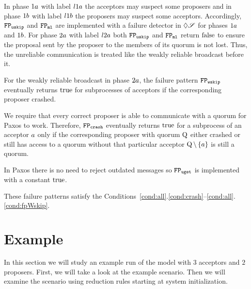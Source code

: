In phase $1a$ with label $l1a$ the acceptors may suspect some proposers and in phase $1b$ with label $l1b$ the proposers may suspect some acceptors.
Accordingly, $\mathtt{FP_{uskip}}$ and $\mathtt{FP_{ml}}$ are implemented with a failure detector in $\Diamond\mathscr{S}$ for phases $1a$ and $1b$.
For phase $2a$ with label $l2a$ both $\mathtt{FP_{uskip}}$ and $\mathtt{FP_{ml}}$ return $\operatorname{false}$ to ensure the proposal sent by the proposer to the members of its quorum is not lost.
Thus, the unreliable communication is treated like the weakly reliable broadcast before it.

For the weakly reliable broadcast in phase $2a$, the failure pattern $\mathtt{FP_{wskip}}$ eventually returns $\operatorname{true}$ for subprocesses of acceptors if the corresponding proposer crashed.

We require that every correct proposer is able to communicate with a quorum for Paxos to work.
Therefore, $\mathtt{FP_{crash}}$ eventually returns $\operatorname{true}$ for a subprocess of an acceptor $a$ only if the corresponding proposer with quorum $\operatorname{Q}$ either crashed or still has access to a quorum without that particular acceptor \ie $\operatorname{Q}\setminus\left\{a\right\}$ is still a quorum.

In Paxos there is no need to reject outdated messages so $\mathtt{FP_{uget}}$ is implemented with a constant $\operatorname{true}$.

These failure patterns satisfy the Conditions~\ref{cond:all}.\ref{cond:crash}--\ref{cond:all}.\ref{cond:fpWskip}.

\section{Example}
In this section we will study an example run of the model with $3$ acceptors and $2$ proposers.
First, we will take a look at the example scenario.
Then we will examine the scenario using reduction rules starting at system initialization.

